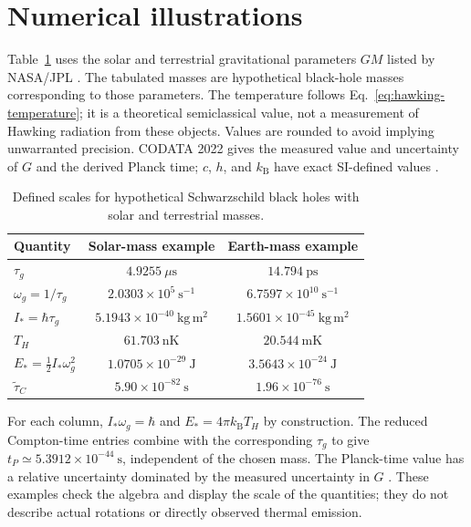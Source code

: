 \documentclass[12pt]{article}
\begin{document}
\section{Numerical illustrations}

Table~\ref{tab:examples} uses the solar and terrestrial gravitational parameters $GM$ listed by NASA/JPL \cite{JPL}. The tabulated masses are hypothetical black-hole masses corresponding to those parameters. The temperature follows Eq.~\eqref{eq:hawking-temperature}; it is a theoretical semiclassical value, not a measurement of Hawking radiation from these objects. Values are rounded to avoid implying unwarranted precision. CODATA 2022 gives the measured value and uncertainty of $G$ and the derived Planck time; $c$, $h$, and $k_{\mathrm B}$ have exact SI-defined values \cite{CODATA}.

\begin{table}[ht]
  \centering
  \caption{Defined scales for hypothetical Schwarzschild black holes with solar and terrestrial masses.}
  \label{tab:examples}
  \begin{tabular}{lcc}
    \toprule
    Quantity & Solar-mass example & Earth-mass example \\
    \midrule
    $\tau_g$ & $4.9255\ \mu\mathrm{s}$ & $14.794\ \mathrm{ps}$ \\
    $\omega_g=1/\tau_g$ & $2.0303\times10^5\ \mathrm{s^{-1}}$ & $6.7597\times10^{10}\ \mathrm{s^{-1}}$ \\
    $I_*=\hbar\tau_g$ & $5.1943\times10^{-40}\ \mathrm{kg\,m^2}$ & $1.5601\times10^{-45}\ \mathrm{kg\,m^2}$ \\
    $T_H$ & $61.703\ \mathrm{nK}$ & $20.544\ \mathrm{mK}$ \\
    $E_*=\tfrac12 I_*\omega_g^2$ & $1.0705\times10^{-29}\ \mathrm{J}$ & $3.5643\times10^{-24}\ \mathrm{J}$ \\
    $\tilde{\tau}_C$ & $5.90\times10^{-82}\ \mathrm{s}$ & $1.96\times10^{-76}\ \mathrm{s}$ \\
    \bottomrule
  \end{tabular}
\end{table}

For each column, $I_*\omega_g=\hbar$ and $E_*=4\pi k_{\mathrm B}T_H$ by construction. The reduced Compton-time entries combine with the corresponding $\tau_g$ to give $t_P\simeq5.3912\times10^{-44}\ \mathrm{s}$, independent of the chosen mass. The Planck-time value has a relative uncertainty dominated by the measured uncertainty in $G$ \cite{CODATA}. These examples check the algebra and display the scale of the quantities; they do not describe actual rotations or directly observed thermal emission.
\end{document}
